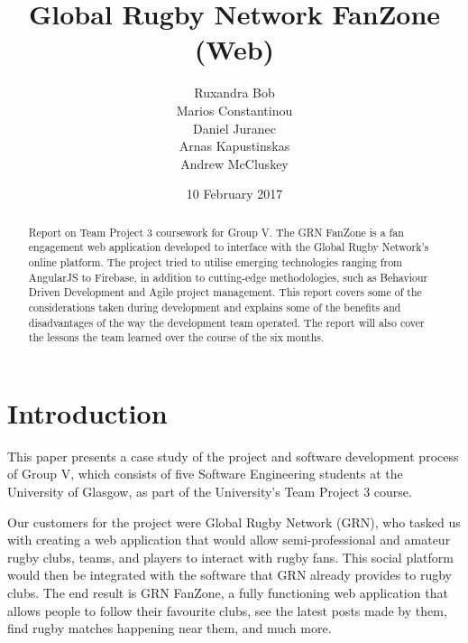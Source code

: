 \documentclass{l3proj}
\begin{document}
\title{Global Rugby Network FanZone (Web)}
\author{Ruxandra Bob \\
		Marios Constantinou \\
        Daniel Juranec \\
        Arnas Kapustinskas \\
        Andrew McCluskey}
\date{10 February 2017}
\maketitle
\begin{abstract}
Report on Team Project 3 coursework for Group V. The GRN FanZone is a
 fan engagement web application developed to interface with the Global Rugby
 Network's online platform. The project tried to utilise
 emerging technologies ranging from AngularJS to Firebase, in addition to
 cutting-edge methodologies, such as Behaviour Driven Development and Agile
 project management. This report covers some of the considerations taken
 during development and explains some of the benefits and disadvantages
 of the way the development team operated. The report will also cover the lessons
 the team learned over the course of the six months.
\end{abstract}
\educationalconsent
\newpage
\section{Introduction} %

This paper presents a case study of the project and software development process
 of Group V, which consists of five Software Engineering students at the
 University of Glasgow, as part of the University's Team Project 3 course.

Our customers for the project were Global Rugby Network (GRN), who tasked us
 with creating a web application that would allow semi-professional and amateur
 rugby clubs, teams, and players to interact with rugby fans. This social
 platform would then be integrated with the software that GRN already provides
 to rugby clubs. The end result is GRN FanZone, a fully functioning web application
 that allows people to follow their favourite clubs, see the latest posts
 made by them, find rugby matches happening near them, and much more.
\end{document}
